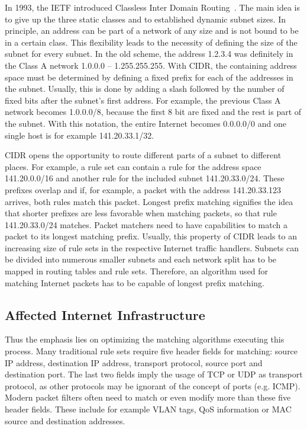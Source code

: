 \documentclass[a4paper,
		12pt,
		parskip=full,
		titlepage
		]{scrartcl}
\begin{document}
In 1993, the IETF introduced Classless Inter Domain Routing~\cite{rfc1518, rfc4632}.
The main idea is to give up the three static classes and to established dynamic subnet sizes.
In principle, an address can be part of a network of any size and is not bound to be in a certain class.
This flexibility leads to the necessity of defining the size of the subnet for every subnet.
In the old scheme, the address 1.2.3.4 was definitely in the Class A network 1.0.0.0 -- 1.255.255.255.
With CIDR, the containing address space must be determined by defining a fixed prefix for each of the addresses in the subnet.
Usually, this is done by adding a slash followed by the number of fixed bits after the subnet's first address.
For example, the previous Class A network becomes 1.0.0.0/8, because the first 8 bit are fixed and the rest is part of the subnet.
With this notation, the entire Internet becomes 0.0.0.0/0 and one single host is for example 141.20.33.1/32.

CIDR opens the opportunity to route different parts of a subnet to different places.
For example, a rule set can contain a rule for the address space 141.20.0.0/16 and another rule for the included subnet 141.20.33.0/24.
These prefixes overlap and if, for example, a packet with the address 141.20.33.123 arrives, both rules match this packet.
Longest prefix matching signifies the idea that shorter prefixes are less favorable when matching packets, so that rule 141.20.33.0/24 matches.
Packet matchers need to have capabilities to match a packet to its longest matching prefix.
Usually, this property of CIDR leads to an increasing size of rule sets in the respective Internet traffic handlers.
Subnets can be divided into numerous smaller subnets and each network split has to be mapped in routing tables and rule sets.
Therefore, an algorithm used for matching Internet packets has to be capable of longest prefix matching.

\subsection{Affected Internet Infrastructure}
Thus the emphasis lies on optimizing the matching algorithms executing this process.
Many traditional rule sets require five header fields for matching: source 
IP address, destination IP address, transport protocol, source port and destination port.
The last two fields imply the usage of TCP or UDP as transport protocol, 
as other protocols may be ignorant of the concept of ports (e.g. ICMP).
Modern packet filters often need to match or even modify more than these five header fields.
These include for example VLAN tags, QoS information or MAC source and destination addresses.
\end{document}
